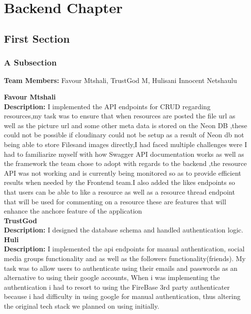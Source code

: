 \chapter{Backend Chapter}

\section{First Section}


\subsection{A Subsection}

\textbf{Team Members:} Favour Mtshali, TrustGod M, Hulisani Innocent Netshaulu

\textbf{Favour Mtshali} \\
\textbf{Description:} I implemented the API endpoints for CRUD regarding resources,my task was to ensure that when resources are posted the file url as well as the picture url and some other meta data is stored on the Neon DB ,these could not be possible if cloudinary could not be setup as a result of Neon db not being able to store Filesand images directly,I had faced multiple challenges were I had to familiarize myself with how Swagger API documentation works as well as the framework the team chose to adopt with regards to the backend ,the resource API was not working and is currently being monitored so as to provide efficient results when needed by the Frontend team.I also added the likes endpoints so that users can be able to like a resource as well as a resource thread endpoint that will be used for commenting on a resource these are features that will enhance the anchore feature of the application \\[2mm]

\textbf{TrustGod} \\
\textbf{Description:} I designed the database schema and handled authentication logic. \\[2mm]

\textbf{Huli} \\
\textbf{Description:} I implemented the api endpoints for manual authentication, social media groups functionality and as well as the followers functionality(friends). My task was to allow users to authenticate using their emails and passwords as an alternative to using their google accounts, When i was implementing the authentication i had to resort to using the FireBase 3rd party authenticater because i had difficulty in using google for manual authentication, thus altering the original tech stack we planned on using initially. \\[2mm]
